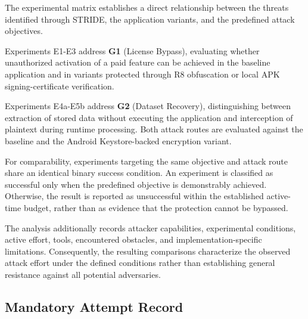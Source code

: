 \documentclass{article}
\newcounter{threat}
\begin{document}
The experimental matrix establishes a direct relationship between the threats identified through STRIDE, the application variants, and the predefined attack objectives.

Experiments E1-E3 address \textbf{G1} (License Bypass), evaluating whether unauthorized activation of a paid feature can be achieved in the baseline application and in variants protected through R8 obfuscation or local APK signing-certificate verification.

Experiments E4a-E5b address \textbf{G2} (Dataset Recovery), distinguishing between extraction of stored data without executing the application and interception of plaintext during runtime processing. Both attack routes are evaluated against the baseline and the Android Keystore-backed encryption variant.

For comparability, experiments targeting the same objective and attack route share an identical binary success condition. An experiment is classified as successful only when the predefined objective is demonstrably achieved. Otherwise, the result is reported as unsuccessful within the established active-time budget, rather than as evidence that the protection cannot be bypassed.

The analysis additionally records attacker capabilities, experimental conditions, active effort, tools, encountered obstacles, and implementation-specific limitations. Consequently, the resulting comparisons characterize the observed attack effort under the defined conditions rather than establishing general resistance against all potential adversaries.

\subsection{Mandatory Attempt Record}
\end{document}
